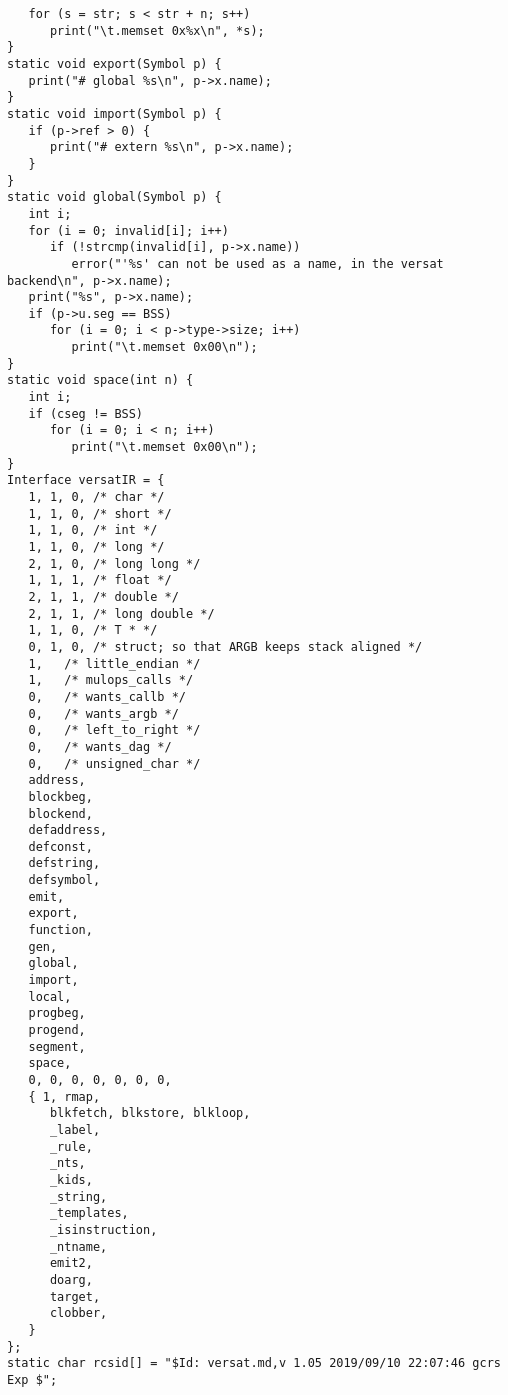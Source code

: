 {\begin{verbatim}
   for (s = str; s < str + n; s++)
      print("\t.memset 0x%x\n", *s);
}
static void export(Symbol p) {
   print("# global %s\n", p->x.name);
}
static void import(Symbol p) {
   if (p->ref > 0) {
      print("# extern %s\n", p->x.name);
   }
}
static void global(Symbol p) {
   int i;
   for (i = 0; invalid[i]; i++)
      if (!strcmp(invalid[i], p->x.name))
         error("'%s' can not be used as a name, in the versat backend\n", p->x.name);
   print("%s", p->x.name);
   if (p->u.seg == BSS)
      for (i = 0; i < p->type->size; i++)
         print("\t.memset 0x00\n");
}
static void space(int n) {
   int i;
   if (cseg != BSS)
      for (i = 0; i < n; i++)
         print("\t.memset 0x00\n");
}
Interface versatIR = {
   1, 1, 0, /* char */
   1, 1, 0, /* short */
   1, 1, 0, /* int */
   1, 1, 0, /* long */
   2, 1, 0, /* long long */
   1, 1, 1, /* float */
   2, 1, 1, /* double */
   2, 1, 1, /* long double */
   1, 1, 0, /* T * */
   0, 1, 0, /* struct; so that ARGB keeps stack aligned */
   1,   /* little_endian */
   1,   /* mulops_calls */
   0,   /* wants_callb */
   0,   /* wants_argb */
   0,   /* left_to_right */
   0,   /* wants_dag */
   0,   /* unsigned_char */
   address,
   blockbeg,
   blockend,
   defaddress,
   defconst,
   defstring,
   defsymbol,
   emit,
   export,
   function,
   gen,
   global,
   import,
   local,
   progbeg,
   progend,
   segment,
   space,
   0, 0, 0, 0, 0, 0, 0,
   { 1, rmap,
      blkfetch, blkstore, blkloop,
      _label,
      _rule,
      _nts,
      _kids,
      _string,
      _templates,
      _isinstruction,
      _ntname,
      emit2,
      doarg,
      target,
      clobber,
   }
};
static char rcsid[] = "$Id: versat.md,v 1.05 2019/09/10 22:07:46 gcrs Exp $";
\end{verbatim}
}


\cleardoublepage
